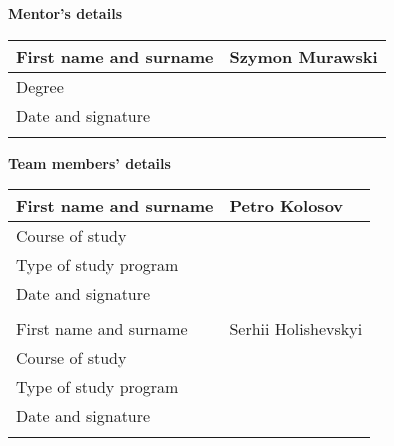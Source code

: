 \documentclass[
    11pt,
    english, %
    singlespacing, %
    headsepline, %
    oneside, %
]{MastersDoctoralThesis} %
\begin{document}
    \begin{partnerdetailspage}
        \textbf{Mentor's details} \\

        \begin{tabular}{|p{5cm}|p{5cm}|}
            \hline
            First name and surname & Szymon Murawski \\
            \hline
            Degree                 &                 \\
            \hline
            Date and signature     &                 \\
            \hline
            \multicolumn{2}{c}{\vspace{0.5cm}} \\
        \end{tabular}

        \textbf{Team members' details} \\

        \begin{tabular}{|p{5cm}|p{5cm}|}
            \hline
            First name and surname & Petro Kolosov        \\
            \hline
            Course of study        &                      \\
            \hline
            Type of study program  &                      \\
            \hline
            Date and signature     &                      \\
            \hline

            \multicolumn{2}{c}{\vspace{0.5cm}} \\

            \hline
            First name and surname & Serhii Holishevskyi  \\
            \hline
            Course of study        &                      \\
            \hline
            Type of study program  &                      \\
            \hline
            Date and signature     &                      \\
            \hline

            \multicolumn{2}{c}{\vspace{0.5cm}} \\


\end{tabular}
\end{partnerdetailspage}
\end{document}
